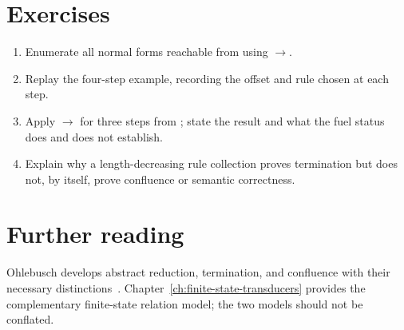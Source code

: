 \section{Exercises}
\label{sec:ch81-exercises}
\begin{enumerate}
\item\label{ex:ch81-overlap} Enumerate all normal forms reachable from  using $\to$.
\item\label{ex:ch81-trace} Replay the four-step  example, recording the offset and rule chosen at each step.
\item\label{ex:ch81-fuel} Apply $\to$ for three steps from ; state the result and what the fuel status does and does not establish.
\item\label{ex:ch81-properties} Explain why a length-decreasing rule collection proves termination but does not, by itself, prove confluence or semantic correctness.
\end{enumerate}

\section{Further reading}
\label{sec:ch81-reading}
Ohlebusch develops abstract reduction, termination, and confluence with their necessary distinctions~\cite{ohlebusch-2002-rewriting}.
Chapter~\ref{ch:finite-state-transducers} provides the complementary finite-state relation model; the two models should not be conflated.

